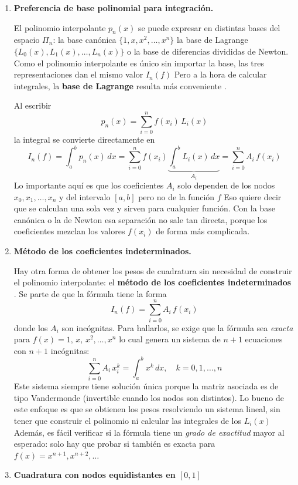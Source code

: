 \documentclass[12pt]{article}
\begin{document}
\begin{enumerate}
	\item \textbf{Preferencia de base polinomial para integración.}

	El polinomio interpolante $p_n(x)$ se puede expresar en distintas bases del espacio $\Pi_n$: la base canónica $\{1,x,x^2,\ldots,x^n\}$ la base de Lagrange $\{L_0(x),L_1(x),\ldots,L_n(x)\}$ o la base de diferencias divididas de Newton. Como el polinomio interpolante es único sin importar la base, las tres representaciones dan el mismo valor $I_n(f)$ Pero a la hora de calcular integrales, la \textbf{base de Lagrange} resulta más conveniente \cite{burden02}.

	Al escribir
	\[
	p_n(x) = \sum_{i=0}^{n} f(x_i)\,L_i(x)
	\]
	la integral se convierte directamente en
	\[
	I_n(f) = \int_a^b p_n(x)\,dx = \sum_{i=0}^{n} f(x_i) \underbrace{\int_a^b L_i(x)\,dx}_{A_i} = \sum_{i=0}^{n} A_i\,f(x_i)
	\]
	Lo importante aquí es que los coeficientes $A_i$ solo dependen de los nodos $x_0,x_1,\ldots,x_n$ y del intervalo $[a,b]$ pero no de la función $f$ Eso quiere decir que se calculan una sola vez y sirven para cualquier función. Con la base canónica o la de Newton esa separación no sale tan directa, porque los coeficientes mezclan los valores $f(x_i)$ de forma más complicada.

	\item \textbf{Método de los coeficientes indeterminados.}

	Hay otra forma de obtener los pesos de cuadratura sin necesidad de construir el polinomio interpolante: el \textbf{método de los coeficientes indeterminados} \cite{chapra07}. Se parte de que la fórmula tiene la forma
	\[
	I_n(f) = \sum_{i=0}^{n} A_i\,f(x_i)
	\]
	donde los $A_i$ son incógnitas. Para hallarlos, se exige que la fórmula sea \textit{exacta} para $f(x) = 1,\, x,\, x^2, \ldots, x^n$ lo cual genera un sistema de $n+1$ ecuaciones con $n+1$ incógnitas:
	\[
	\sum_{i=0}^{n} A_i\,x_i^k = \int_a^b x^k\,dx, \quad k=0,1,\ldots,n
	\]
	Este sistema siempre tiene solución única porque la matriz asociada es de tipo Vandermonde (invertible cuando los nodos son distintos). Lo bueno de este enfoque es que se obtienen los pesos resolviendo un sistema lineal, sin tener que construir el polinomio ni calcular las integrales de los $L_i(x)$ Además, es fácil verificar si la fórmula tiene un \textit{grado de exactitud} mayor al esperado: solo hay que probar si también es exacta para $f(x) = x^{n+1}, x^{n+2},\ldots$

	\item \textbf{Cuadratura con nodos equidistantes en $[0,1]$}


\end{enumerate}
\end{document}
